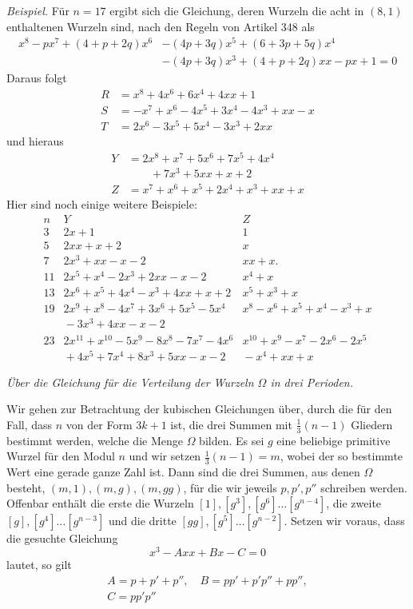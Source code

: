 \textit{Beispiel.} Für \(n=17\) ergibt sich die Gleichung, deren Wurzeln die acht in \((8,1)\) enthaltenen Wurzeln sind, nach den Regeln von Artikel 348 als \[\begin{aligned}x^8-px^7+(4+p+2q)x^6&-(4p+3q)x^5+(6+3p+5q)x^4\\&-(4p+3q)x^3+(4+p+2q)xx-px+1=0\end{aligned}\] Daraus folgt \[\begin{aligned}R&=x^8+4x^6+6x^4+4xx+1\\S&=-x^7+x^6-4x^5+3x^4-4x^3+xx-x\\T&=2x^6-3x^5+5x^4-3x^3+2xx\end{aligned}\] und hieraus \[\begin{aligned}Y&=2x^8+x^7+5x^6+7x^5+4x^4\\&\qquad+7x^3+5xx+x+2\\Z&=x^7+x^6+x^5+2x^4+x^3+xx+x\end{aligned}\] Hier sind noch einige weitere Beispiele: {\small\setlength{\arraycolsep}{4pt}\[\begin{array}{c|l|l}n&Y&Z\\\hline 3&2x+1&1\\5&2xx+x+2&x\\7&2x^3+xx-x-2&xx+x.\\11&2x^5+x^4-2x^3+2xx-x-2&x^4+x\\13&2x^6+x^5+4x^4-x^3+4xx+x+2&x^5+x^3+x\\19&2x^9+x^8-4x^7+3x^6+5x^5-5x^4&x^8-x^6+x^5+x^4-x^3+x\\{}&{}-3x^3+4xx-x-2&{}\\23&2x^{11}+x^{10}-5x^9-8x^8-7x^7-4x^6&x^{10}+x^9-x^7-2x^6-2x^5\\{}&{}+4x^5+7x^4+8x^3+5xx-x-2&{}-x^4+xx+x\end{array}\]}

\begin{center}\itshape \textit{Über die Gleichung für die Verteilung der Wurzeln \(\Omega\) in drei Perioden.}\end{center}


Wir gehen zur Betrachtung der kubischen Gleichungen über, durch die für den Fall, dass \(n\) von der Form \(3k+1\) ist, die drei Summen mit \(\frac13(n-1)\) Gliedern bestimmt werden, welche die Menge \(\Omega\) bilden. Es sei \(g\) eine beliebige primitive Wurzel für den Modul \(n\) und wir setzen \(\frac13(n-1)=m\), wobei der so bestimmte Wert eine gerade ganze Zahl ist. Dann sind die drei Summen, aus denen \(\Omega\) besteht, \((m,1),\allowbreak (m,g),\allowbreak (m,gg)\), für die wir jeweils \(p,\allowbreak p',\allowbreak p''\) schreiben werden. Offenbar enthält die erste die Wurzeln \([1],\allowbreak [g^3],\allowbreak [g^6]\ldots[g^{n-4}]\), die zweite \([g],\allowbreak [g^4]\ldots[g^{n-3}]\) und die dritte \([gg],\allowbreak [g^5]\ldots[g^{n-2}]\). Setzen wir voraus, dass die gesuchte Gleichung \[x^3-Axx+Bx-C=0\] lautet, so gilt \[\begin{gathered}A=p+p'+p'',\quad B=pp'+p'p''+pp'',\\C=pp'p''\end{gathered}\]

